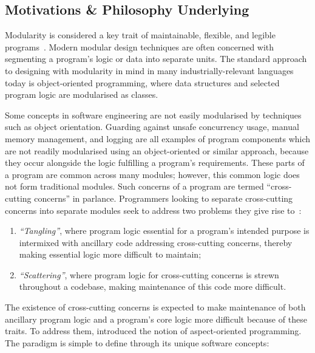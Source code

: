\subsection{Motivations \& Philosophy Underlying \AspectOrientation{}}
\label{review_aop_motivations_and_philosophy}

Modularity is considered a key trait of maintainable, flexible, and legible
programs~\cite{Parnas_1972,dijkstra1968letters}. Modern modular design
techniques are often concerned with segmenting a program's logic or data into
separate units. The standard approach to designing with modularity in mind in
many industrially-relevant languages today is object-oriented programming, where
data structures and selected program logic are modularised as
classes.

Some concepts in software engineering are not easily modularised by techniques
such as object orientation. Guarding against unsafe concurrency usage, manual
memory management, and logging are all examples of program components which are
not readily modularised using an object-oriented or similar approach, because
they occur alongside the logic fulfilling a program's requirements. These parts
of a program are common across many modules; however, this common logic does not
form traditional modules. Such concerns of a program are termed ``cross-cutting
concerns'' in \aop{} parlance. Programmers looking to separate cross-cutting
concerns into separate modules seek to address two
problems they give rise to~\cite{kiczales1997aspect}:

\begin{enumerate}
    \item \emph{``Tangling''}, where program logic essential for
    a program's intended purpose is intermixed with ancillary code addressing
    cross-cutting concerns, thereby making essential logic more difficult to
    maintain;
    \item \emph{``Scattering''}, where program logic for
    cross-cutting concerns is strewn throughout a codebase, making maintenance
    of this code more difficult.
\end{enumerate}

The existence of cross-cutting concerns is expected to make maintenance of both
ancillary program logic and a program's core logic more difficult because of
these traits. To address them, \citet{kiczales1997aspect} introduced the notion
of aspect-oriented programming. The paradigm is simple to define through its
unique software concepts:

